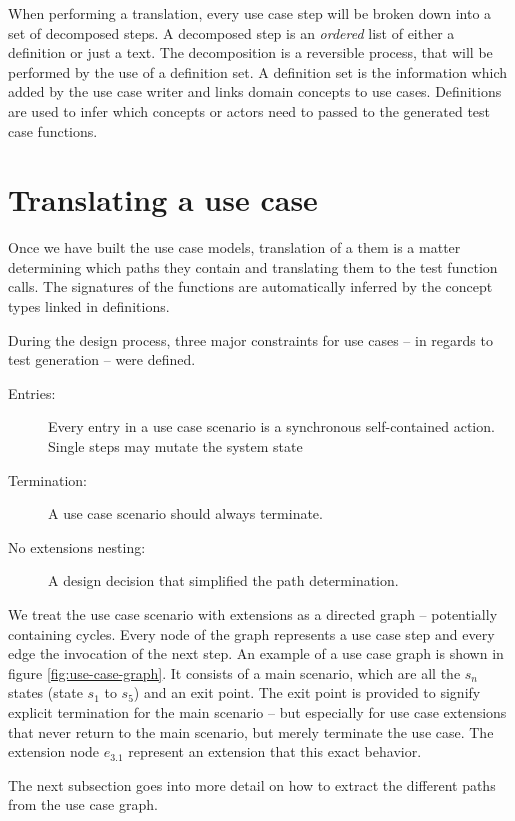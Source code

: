\noindent When performing a translation, every use case step will be broken down into a set of decomposed steps. A decomposed step is an \emph{ordered} list of either a definition or just a text. The decomposition is a reversible process, that will be performed by the use of a definition set. A definition set is the information which added by the use case writer and links domain concepts to use cases. Definitions are used to infer which concepts or actors need to passed to the generated test case functions.

\section{Translating a use case}
Once we have built the use case models, translation of a them is a matter determining which paths they contain and translating them to the test function calls. The signatures of the functions are automatically inferred by the concept types linked in definitions.\bigskip

\noindent During the design process, three major constraints for use cases -- in regards to test generation -- were defined. 
\begin{description}
  \item[Entries:] Every entry in a use case scenario is a synchronous self-contained action. Single steps may mutate the system state
  \item[Termination:] A use case scenario should always terminate.
  \item[No extensions nesting:] A design decision that simplified the path determination.
\end{description}
We treat the use case scenario with extensions as a directed graph -- potentially containing cycles. Every node of the graph represents a use case step and every edge the invocation of the next step. An example of a use case graph is shown in figure \ref{fig:use-case-graph}. It consists of a main scenario, which are all the $s_n$ states (state $s_1$ to $s_5$) and an exit point. The exit point is provided to signify explicit termination for the main scenario -- but especially for use case extensions that never return to the main scenario, but merely terminate the use case. The extension node $e_{3.1}$ represent an extension that this exact behavior.\bigskip

\noindent The next subsection goes into more detail on how to extract the different paths from the use case graph.

